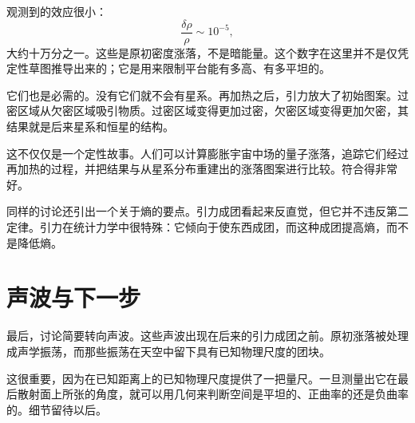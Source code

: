 \begin{classroomqa}
\end{classroomqa}

观测到的效应很小：
\begin{equation}
\frac{\delta\rho}{\rho}\sim 10^{-5},
\end{equation}
大约十万分之一。这些是原初密度涨落，不是暗能量。这个数字在这里并不是仅凭定性草图推导出来的；它是用来限制平台能有多高、有多平坦的。

它们也是必需的。没有它们就不会有星系。再加热之后，引力放大了初始图案。过密区域从欠密区域吸引物质。过密区域变得更加过密，欠密区域变得更加欠密，其结果就是后来星系和恒星的结构。

这不仅仅是一个定性故事。人们可以计算膨胀宇宙中场的量子涨落，追踪它们经过再加热的过程，并把结果与从星系分布重建出的涨落图案进行比较。符合得非常好。

同样的讨论还引出一个关于熵的要点。引力成团看起来反直觉，但它并不违反第二定律。引力在统计力学中很特殊：它倾向于使东西成团，而这种成团提高熵，而不是降低熵。

\begin{classroomqa}
\end{classroomqa}

\section{声波与下一步}

最后，讨论简要转向声波。这些声波出现在后来的引力成团之前。原初涨落被处理成声学振荡，而那些振荡在天空中留下具有已知物理尺度的团块。

这很重要，因为在已知距离上的已知物理尺度提供了一把量尺。一旦测量出它在最后散射面上所张的角度，就可以用几何来判断空间是平坦的、正曲率的还是负曲率的。细节留待以后。

\begin{classroomqa}
\end{classroomqa}